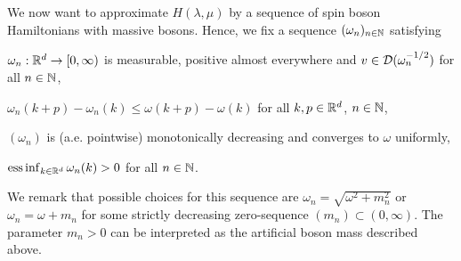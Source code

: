 \documentclass[a4paper,12pt,oneside]{article}
\begin{document}
%
We now want to approximate $H(\lambda,\mu)$ by a sequence of spin boson Hamiltonians with massive bosons. Hence, we fix a sequence $(\omega_n)_{n\in{\mathbb N}}$ satisfying
\begin{enumhyp}
	\item $\omega_n:{\mathbb R}^d\to[0,\infty)$ is measurable, positive almost everywhere and $v\in{\mathcal D}(\omega_n^{-1/2})$ for all $n\in{\mathbb N}$,
	\item $\omega_n(k+p)-\omega_n(k)\le \omega(k+p)-\omega(k)$ for all $k,p\in{\mathbb R}^d$, $n\in{\mathbb N}$,
	\item $(\omega_n)$ is (a.e. pointwise) monotonically decreasing and converges to $\omega$ uniformly,
	\item $\operatorname*{ess\,inf}_{k\in{\mathbb R}^d} \omega_n(k)>0$ for all $n\in{\mathbb N}$.
\end{enumhyp}
We remark that possible choices for this sequence are $\omega_n = \sqrt{\omega^2 + m_n^2}$ or $\omega_n = \omega + m_n$ for some strictly decreasing zero-sequence $(m_n)\subset (0,\infty)$. The parameter $m_n>0$ can be interpreted as the artificial boson mass described above.
\end{document}
